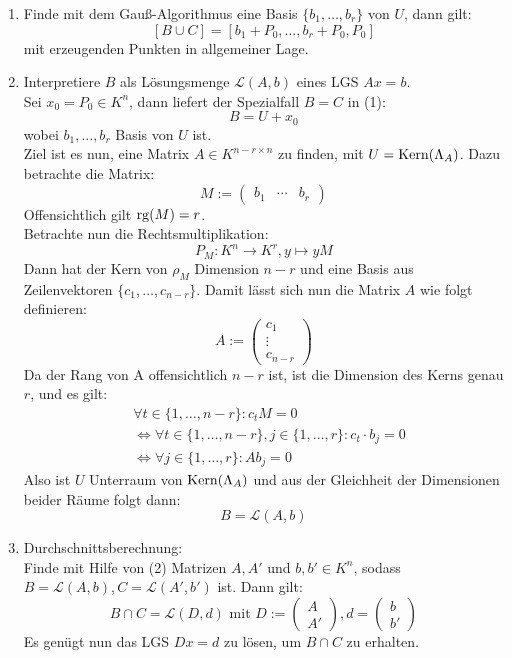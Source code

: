 \documentclass[parskip,a4paper,twoside,DIV15,BCOR12mm]{scrbook}
\begin{document}
\begin{enumerate}
\item Finde mit dem Gauß-Algorithmus eine Basis $\{b_1,\ldots,b_r\}$ von $U$, dann gilt:
\[[B\cup C]=[b_1+P_0,\ldots,b_r+P_0,P_0]\]
mit erzeugenden Punkten in allgemeiner Lage.
\item Interpretiere $B$ als Lösungsmenge $\mathcal{L}(A,b)$ eines LGS $Ax=b$.\\
Sei $x_0=P_0\in K^n$, dann liefert der Spezialfall $B=C$ in (1):
\[B=U+x_0\]
wobei ${b_1,\ldots,b_r}$ Basis von $U$ ist.\\
Ziel ist es nun, eine Matrix $A\in K^{n-r\times n}$ zu finden, mit $U=\operatorname{Kern}(\Lambda_A)$.
Dazu betrachte die Matrix:
\[M:=
\begin{pmatrix}
b_1&\cdots&b_r
\end{pmatrix}\]
Offensichtlich gilt $\operatorname{rg}(M)=r$.\\
Betrachte nun die Rechtsmultiplikation:
\[ P_M:K^n\to K^r,y\mapsto yM\]
Dann hat der Kern von $\rho_M$ Dimension $n-r$ und eine Basis aus Zeilenvektoren
$\{c_1,\ldots,c_{n-r}\}$. Damit lässt sich nun die Matrix $A$ wie folgt definieren:
\[A:=
\begin{pmatrix}
c_1\\
\vdots\\
c_{n-r}
\end{pmatrix}\]
Da der Rang von A offensichtlich $n-r$ ist, ist die Dimension des Kerns genau $r$, und es gilt:
\begin{align*}
&\forall t\in\{1,\ldots,n-r\}: c_tM=0\\
&\iff\forall t\in\{1,\ldots,n-r\},j\in\{1,\ldots,r\}: c_t\cdot b_j=0\\
&\iff\forall j\in\{1,\ldots,r\}: Ab_j=0
\end{align*}
Also ist $U$ Unterraum von $\operatorname{Kern}(\Lambda_A)$ und aus der Gleichheit der Dimensionen
beider Räume folgt dann:
\[B=\mathcal{L}(A,b)\]
\item Durchschnittsberechnung:\\
Finde mit Hilfe von (2) Matrizen $A,A'$ und $b,b'\in K^n$, sodass $B=\mathcal{L}(A,b),
C=\mathcal{L}(A',b')$ ist. Dann gilt:
\[B\cap C = \mathcal{L}(D,d)\text{ mit }D:=
\begin{pmatrix}
A\\
A'
\end{pmatrix}, d=
\begin{pmatrix}
b\\
b'
\end{pmatrix}\]
Es genügt nun das LGS $Dx=d$ zu lösen, um $B\cap C$ zu erhalten. 
\end{enumerate}
\end{document}
